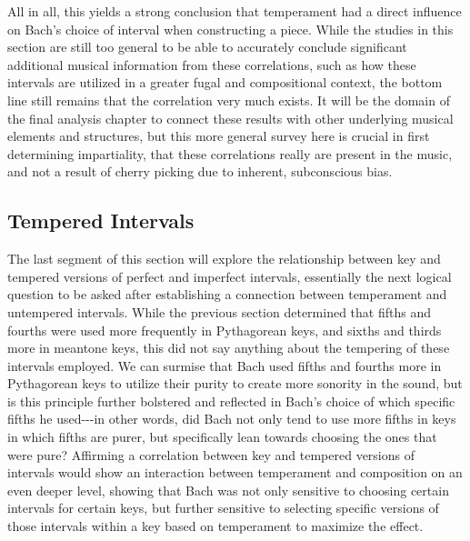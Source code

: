 All in all, this yields a strong conclusion that temperament had a
direct influence on Bach's choice of interval when constructing a piece.
While the studies in this section are still too general to be able to
accurately conclude significant additional musical information from
these correlations, such as how these intervals are utilized in a
greater fugal and compositional context, the bottom line still remains
that the correlation very much exists. It will be the domain of the
final analysis chapter to connect these results with other underlying
musical elements and structures, but this more general survey here is
crucial in first determining impartiality, that these correlations
really are present in the music, and not a result of cherry picking due
to inherent, subconscious bias.

    \subsection{Tempered Intervals}\label{tempered-intervals}

The last segment of this section will explore the relationship between
key and tempered versions of perfect and imperfect intervals,
essentially the next logical question to be asked after establishing a
connection between temperament and untempered intervals. While the
previous section determined that fifths and fourths were used more
frequently in Pythagorean keys, and sixths and thirds more in meantone
keys, this did not say anything about the tempering of these intervals
employed. We can surmise that Bach used fifths and fourths more in
Pythagorean keys to utilize their purity to create more sonority in the
sound, but is this principle further bolstered and reflected in Bach's
choice of which specific fifths he used-\/-\/-in other words, did Bach
not only tend to use more fifths in keys in which fifths are purer, but
specifically lean towards choosing the ones that were pure? Affirming a
correlation between key and tempered versions of intervals would show an
interaction between temperament and composition on an even deeper level,
showing that Bach was not only sensitive to choosing certain intervals
for certain keys, but further sensitive to selecting specific versions
of those intervals within a key based on temperament to maximize the
effect.

